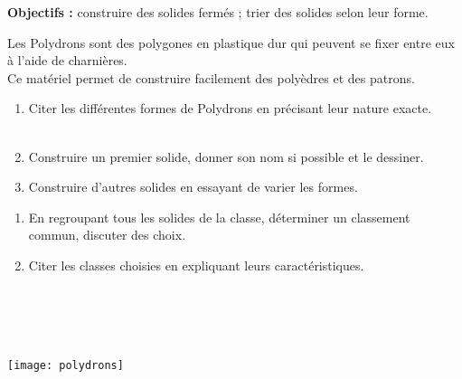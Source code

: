 \begin{activite}
   {\bf Objectifs :} construire des solides fermés ; trier des solides selon leur forme.
   \begin{QCM}
      Les Polydrons sont des polygones en plastique dur qui peuvent se fixer entre eux à l'aide de charnières. \\
      Ce matériel permet de construire facilement des polyèdres et des patrons. \\
         \begin{enumerate}
            \item Citer les différentes formes de Polydrons en précisant leur nature exacte. \\ [3mm]
               \pointilles \\
            \item Construire un premier solide, donner son nom si possible et le dessiner. \\ [35mm]
            
            \item Construire d'autres solides en essayant de varier les formes.
         \end{enumerate}       
       \begin{enumerate}
          \item En regroupant tous les solides de la classe, déterminer un classement commun, discuter des choix.
          \item Citer les classes choisies en expliquant leurs caractéristiques. \\ [3mm]
             \pointilles \\ [3mm]
             \pointilles \\ [3mm]
             \pointilles \\ [3mm]
             \pointilles \\ [3mm]
             \pointilles
       \end{enumerate}
    \begin{center}
         \texttt{[image: polydrons]} \\
      \end{center}
   \end{QCM}
\end{activite}


\cours 

